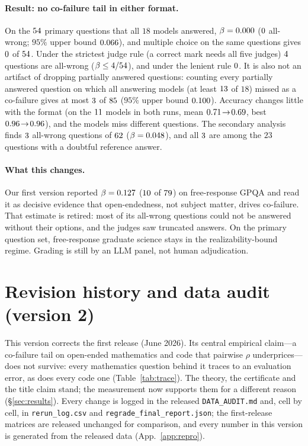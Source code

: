 \documentclass[11pt]{article}
\theoremstyle{plain}
\theoremstyle{definition}
\begin{document}
\paragraph{Result: no co-failure tail in either format.} On the $54$ primary questions that all $18$ models answered,
$\beta=0.000$ ($0$ all-wrong; $95\%$ upper bound $0.066$), and multiple choice on the same questions gives
$0$ of $54$. Under the strictest judge rule (a correct mark needs all five judges) $4$ questions are all-wrong
($\beta\le4/54$), and under the lenient rule $0$. It is also not an artifact of dropping partially answered
questions: counting every partially answered question on which all answering models (at least $13$ of $18$) missed as
a co-failure gives at most $3$ of $85$ ($95\%$ upper bound $0.100$). Accuracy changes little with the format
(on the $11$ models in both runs, mean $0.71\!\to\!0.69$, best
$0.96\!\to\!0.96$), and the models miss different questions. The secondary analysis finds $3$ all-wrong
questions of $62$ ($\beta=0.048$), and all $3$ are among the $23$ questions with a doubtful
reference answer.

\paragraph{What this changes.} Our first version reported $\beta=0.127$ ($10$ of $79$) on free-response
GPQA and read it as decisive evidence that open-endedness, not subject matter, drives co-failure. That estimate is retired: most
of its all-wrong questions could not be answered without their options, and the judges saw truncated answers. On the primary question set, free-response
graduate science stays in the realizability-bound regime. Grading is still by an LLM panel, not human adjudication.

\section{Revision history and data audit (version 2)}\label{app:audit}
This version corrects the first release (June 2026). Its central empirical claim---a co-failure tail on open-ended
mathematics and code that pairwise $\rho$ underprices---does not survive: every mathematics question behind it traces to an
evaluation error, as does every code one (Table~\ref{tab:trace}). The theory, the certificate and the title claim stand; the measurement now supports
them for a different reason (\S\ref{sec:results}). Every change is logged in the released \texttt{DATA\_AUDIT.md} and, cell by
cell, in \texttt{rerun\_log.csv} and \texttt{regrade\_final\_report.json}; the first-release matrices are released unchanged
for comparison, and every number in this version is generated from the released data (App.~\ref{app:repro}).
\end{document}
